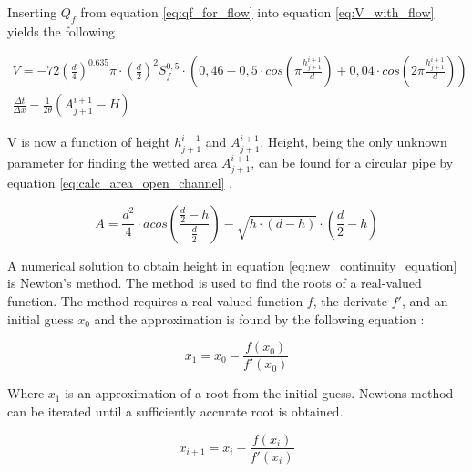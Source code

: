 Inserting $Q_f$ from equation \ref{eq:qf_for_flow} into equation \ref{eq:V_with_flow} yields the following

\begin{equation}\label{eq:new_continuity_equation}
\begin{aligned}
    V = -72\left(\frac{d}{4}\right)^{0.635}\pi\cdot\left(\frac{d}{2}\right)^2S_f^{0,5}\cdot \left(0,46-0,5\cdot cos\left(\pi \frac{h_{j+1}^{i+1}}{d}\right)+ 0,04\cdot cos\left(2\pi\frac{h_{j+1}^{i+1}}{d}\right)\right)\\ \frac{\Delta t}{\Delta x}-\frac{1}{2\theta}\left(A_{j+1}^{i+1}-H\right)
\end{aligned}
\end{equation}

V is now a function of height $h_{j+1}^{i+1}$ and $A_{j+1}^{i+1}$. Height, being the only unknown parameter for finding the wetted area $A_{j+1}^{i+1}$, can be found for a circular pipe by equation \ref{eq:calc_area_open_channel} \cite{ikke_stationear}.

\begin{equation}\label{eq:calc_area_open_channel}
    A = \frac {d^2}{4} \cdot acos \left(\frac{\frac{d}{2}-h}{\frac{d}{2}}\right)-\sqrt{h\cdot (d-h)}\cdot  \left(\frac{d}{2}-h\right)
\end{equation}


A numerical solution to obtain height in equation \ref{eq:new_continuity_equation} is Newton's method. The method is used to find the roots of a real-valued function. The method requires a real-valued function $f$, the derivate $f'$, and an initial guess $x_0$ and the approximation is found by the following equation \cite{szymkiewicz2010numerical}:

\begin{equation}\label{eq:newtons_method_standard}
     x_1 = x_0 - \frac{f(x_0)}{f'(x_0)}
\end{equation} 

Where $x_1$ is an approximation of a root from the initial guess. Newtons method can be iterated until a sufficiently accurate root is obtained.

\begin{equation}\label{eq:newtons_method_standardv2}
     x_{i+1} = x_i - \frac{f(x_i)}{f'(x_i)}
\end{equation} 


